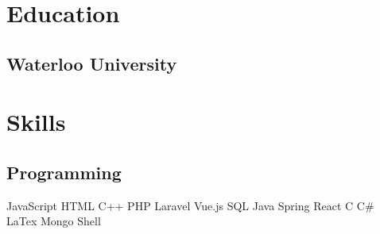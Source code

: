 \documentclass[letterpaper]{deedy-resume} %
\begin{document}
\vspace{-10pt}
\begin{minipage}[t]{0.33\textwidth} %


\sectionspace
\section{Education} 

\subsection{Waterloo University}

\vspace{2pt}



\section{Skills}
\subsection{Programming}
   \textbullet{}JavaScript
  \textbullet{} HTML
    \textbullet{} C++
   \newline{}
   \textbullet{}  PHP
\textbullet{}Laravel
\textbullet{} Vue.js
 \textbullet{} SQL
 \newline
   \textbullet{}Java
   \textbullet{}Spring
   \textbullet{}React
   \textbullet{} C
\newline
   \textbullet{} C\# 
   \textbullet{} LaTex
   \textbullet{} Mongo
    \textbullet{} Shell
   \vspace{5pt}
   

\end{minipage}
\end{document}
